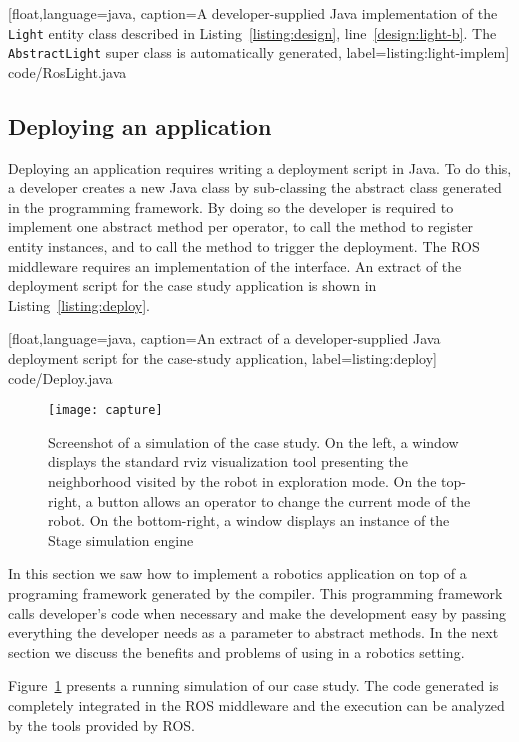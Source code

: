 %
[float,language=java,%
caption={A developer-supplied Java implementation of the
  \texttt{Light} entity class described in
  Listing~\ref{listing:design}, line~\ref{design:light-b}. The
  \texttt{Abstract\-Light} super class is automatically generated},%
label={listing:light-implem}]%
{code/RosLight.java}

\subsection{Deploying an application}

Deploying an application requires writing a deployment script in Java.
To do this, a developer creates a new Java class by sub-classing the
abstract class  generated in the programming framework.
By doing so the developer is required to implement one abstract method
per operator, to call the  method to register entity
instances, and to call the  method to trigger the
deployment. The ROS middleware requires an implementation of the
 interface. An extract of the deployment script for the
case study application is shown in Listing~\ref{listing:deploy}.

%
[float,language=java,%
caption={An extract of a developer-supplied Java deployment script for
  the case-study application},%
label={listing:deploy}]%
{code/Deploy.java}


\begin{figure}
  \centering
 \texttt{[image: capture]}
 \caption{Screenshot of a simulation of the case study. On the left, a
   window displays the standard rviz visualization tool presenting the
   neighborhood visited by the robot in exploration mode. On the
   top-right, a button allows an operator to change the current mode
   of the robot. On the bottom-right, a window displays an instance of
   the Stage simulation engine}
\label{fig:diaspec-simulation}
\end{figure}

In this section we saw how to implement a robotics application on top
of a programing framework generated by the \diaspec{} compiler. This
programming framework calls developer's code when necessary and make
the development easy by passing everything the developer needs as a
parameter to abstract methods. In the next section we discuss the
benefits and problems of using \diaspec{} in a robotics setting.

Figure~\ref{fig:diaspec-simulation} presents a running simulation of
our case study. The code generated is completely integrated in the ROS
middleware and the execution can be analyzed by the tools provided by
ROS.
